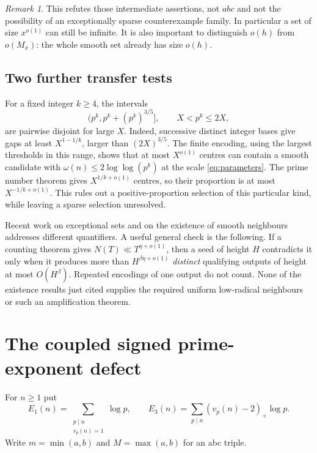 \documentclass[11pt]{amsart}
\theoremstyle{definition}
\theoremstyle{remark}
\newtheorem{remark}[theorem]{Remark}
\newcommand{\loglog}{\log\log}
\newcommand{\pospart}[1]{\left(#1\right)_+}
\begin{document}
\begin{remark}
This refutes those intermediate assertions, not $abc$ and not the possibility
of an exceptionally sparse counterexample family. In particular a set of
size $x^{o(1)}$ can still be infinite. It is also important to distinguish
$o(h)$ from $o(M_x)$: the whole smooth set already has size $o(h)$.
\end{remark}

\subsection{Two further transfer tests}
For a fixed integer $k\ge4$, the intervals
\[
 (p^k,p^k+(p^k)^{3/5}],\qquad X<p^k\le2X,
\]
are pairwise disjoint for large $X$. Indeed, successive distinct integer
bases give gaps at least $X^{1-1/k}$, larger than $(2X)^{3/5}$.
The finite encoding, using the largest thresholds in this range, shows that
at most $X^{o(1)}$ centres can contain a smooth candidate with
$\omega(n)\le2\loglog(p^k)$ at the scale \eqref{eq:parameters}.
The prime number theorem gives $X^{1/k+o(1)}$ centres, so their proportion is
at most $X^{-1/k+o(1)}$. This rules out a positive-proportion selection
of this particular kind, while leaving a sparse selection unresolved.

Recent work on exceptional sets \cite{BBLT,Bernert} and on the existence
of smooth neighbours \cite{Jain} addresses different quantifiers.
A useful general check is the following. If a counting theorem gives
$N(T)\ll T^{\eta+o(1)}$, then a seed of height $H$ contradicts it only
when it produces more than $H^{\beta\eta+o(1)}$ \emph{distinct} qualifying
outputs of height at most $O(H^\beta)$. Repeated encodings of one output do
not count. None of the existence results just cited supplies the required
uniform low-radical neighbours or such an amplification theorem.





\section{The coupled signed prime-exponent defect}\label{sec:signed}

For $n\ge1$ put
\[
 E_1(n)=\sum_{\substack{p\mid n\\v_p(n)=1}}\log p,
 \qquad
 E_3(n)=\sum_{p\mid n}\pospart{v_p(n)-2}\log p.
\]
Write $m=\min(a,b)$ and $M=\max(a,b)$ for an abc triple.
\end{document}
